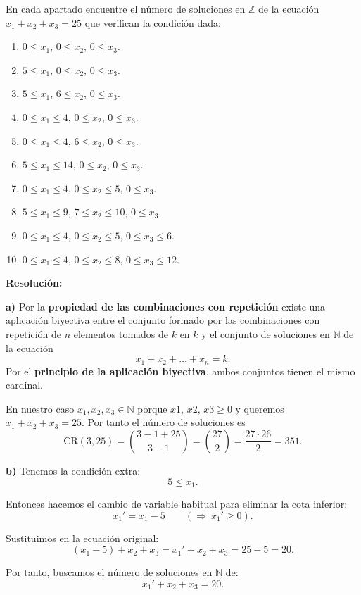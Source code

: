 \documentclass[a4paper,12pt]{article}
\begin{document}
\begin{ejercicio}[title=Ejercicio 31]
En cada apartado encuentre el número de soluciones en $\mathbb{Z}$ de la ecuación $x_1 + x_2 + x_3 = 25$ que verifican la condición dada:

\begin{enumerate}
\item[a)] $0 \le x_1,\, 0 \le x_2,\, 0 \le x_3.$
\item[b)] $5 \le x_1,\, 0 \le x_2,\, 0 \le x_3.$
\item[c)] $5 \le x_1,\, 6 \le x_2,\, 0 \le x_3.$
\item[d)] $0 \le x_1 \le 4,\, 0 \le x_2,\, 0 \le x_3.$
\item[e)] $0 \le x_1 \le 4,\, 6 \le x_2,\, 0 \le x_3.$
\item[f)] $5 \le x_1 \le 14,\, 0 \le x_2,\, 0 \le x_3.$
\item[g)] $0 \le x_1 \le 4,\, 0 \le x_2 \le 5,\, 0 \le x_3.$
\item[h)] $5 \le x_1 \le 9,\, 7 \le x_2 \le 10,\, 0 \le x_3.$
\item[i)] $0 \le x_1 \le 4,\, 0 \le x_2 \le 5,\, 0 \le x_3 \le 6.$
\item[j)] $0 \le x_1 \le 4,\, 0 \le x_2 \le 8,\, 0 \le x_3 \le 12.$
\end{enumerate}

\tcblower
\textbf{Resolución:}

\textbf{a)}  
Por la \textbf{propiedad de las combinaciones con repetición} existe una aplicación biyectiva entre el conjunto formado por las combinaciones con repetición de $n$ elementos tomados de $k$ en $k$ y el conjunto de soluciones en $\mathbb{N}$ de la ecuación
\[
x_1+x_2+\dots+x_n = k.
\]
Por el \textbf{principio de la aplicación biyectiva}, ambos conjuntos tienen el mismo cardinal.

\vspace{0.5em}

En nuestro caso $x_1,x_2,x_3\in\mathbb{N}$ porque $x1,\,x2,\,x3 \ge 0$ y queremos $x_1+x_2+x_3=25$.  
Por tanto el número de soluciones es
\[
\mathrm{CR}(3,25)=\binom{3-1+25}{3-1}=\binom{27}{2}=\frac{27\cdot 26}{2}=\boxed{351}.
\]

\textbf{b)}  
Tenemos la condición extra:
\[
5 \le x_1.
\]

Entonces hacemos el cambio de variable habitual para eliminar la cota inferior:
\[
x_1' = x_1 - 5 \qquad (\Rightarrow\ x_1' \ge 0).
\]

Sustituimos en la ecuación original:
\[
(x_1 - 5) + x_2 + x_3 = x_1' + x_2 + x_3 = 25 - 5 = 20.
\]

Por tanto, buscamos el número de soluciones en $\mathbb{N}$ de:
\[
x_1' + x_2 + x_3 = 20.
\]

\end{ejercicio}
\end{document}
